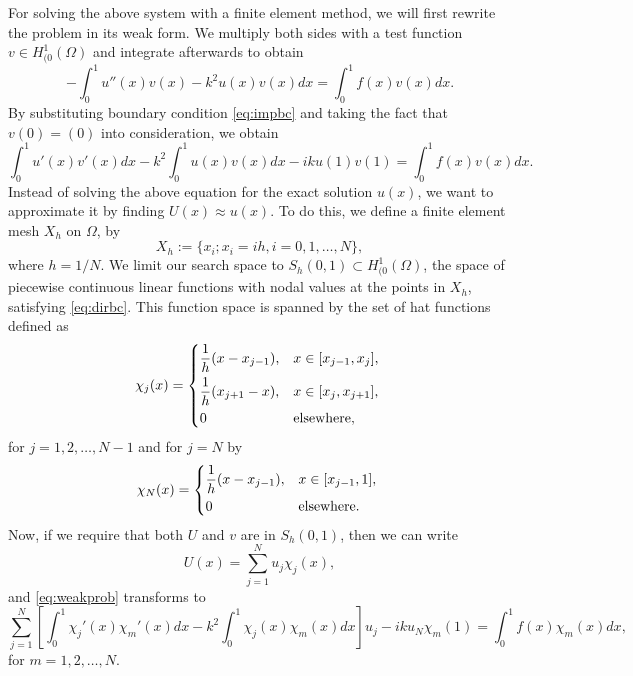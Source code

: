 \documentclass[a4paper]{article}
\newcommand{\HOzero}{\ensuremath{H^1_{(0}(\Omega)}}
\begin{document}
For solving the above system with a finite element method, we will
first rewrite the problem in its weak form.  We multiply both sides
with a test function $v \in \HOzero$ and integrate afterwards to
obtain
\begin{equation}
  - \int^1_0 u''(x)v(x) - k^2u(x)v(x) dx = \int^1_0 f(x)v(x) dx.
\end{equation}
By substituting boundary condition \eqref{eq:impbc} and taking the fact
that $v(0) = (0)$ into consideration, we obtain
\begin{equation} \label{eq:weakprob}
  \int^1_0 u'(x)v'(x)dx - k^2 \int^1_0 u(x)v(x) dx - iku(1)v(1) = \int^1_0 f(x)v(x) dx.
\end{equation}
Instead of solving the above equation for the exact solution $u(x)$,
we want to approximate it by finding $U(x) \approx u(x)$. To do this,
we define a finite element mesh $X_h$ on $\Omega$, by
\begin{equation}
  X_h := \{ x_i ; x_i = ih, i = 0, 1, \ldots, N \},
\end{equation}
where $h = 1/N$.
We limit our search space to $S_h(0,1) \subset \HOzero$, the space of
piecewise continuous linear functions with nodal values at the points
in $X_h$, satisfying \eqref{eq:dirbc}. This function space is spanned
by the set of hat functions defined as
\begin{equation}
  \chi_j(x) = \begin{dcases*}
    \frac{1}{h} (x - x_{j - 1}), & $x \in [x_{j - 1}, x_j],$ \\
    \frac{1}{h} (x_{j + 1} - x), & $x \in [x_{j}, x_{j + 1}],$ \\
    0 & elsewhere,
  \end{dcases*}
\end{equation}
for $j = 1, 2, \ldots, N - 1$ and for $j = N$ by
\begin{equation}
  \chi_N(x) = \begin{dcases*}
    \frac{1}{h} (x - x_{j - 1}), & $x \in [x_{j - 1}, 1],$ \\
    0 & elsewhere.
  \end{dcases*}
\end{equation}
Now, if we require that both $U$ and $v$ are in  $S_h(0,1)$, then we
can write
\begin{equation}
  U(x) = \sum^N_{j = 1} u_j \chi_j(x),
\end{equation}
and \eqref{eq:weakprob} transforms to
\begin{equation}
  \sum^N_{j = 1} \left[ \int^1_0 \chi_j'(x) \chi_m'(x) dx
    - k^2 \int^1_0 \chi_j(x) \chi_m(x) dx \right] u_j
    - i k u_N \chi_m(1)
  =
    \int^1_0 f(x) \chi_m(x) dx,
\end{equation}
for $m = 1, 2, \ldots, N$.
\end{document}
